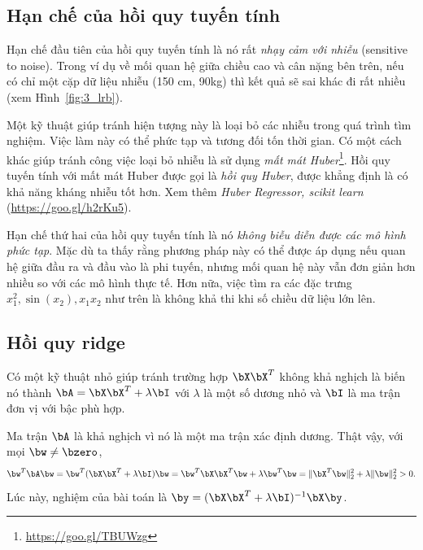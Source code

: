 \subsection{Hạn chế của hồi quy tuyến tính}

Hạn chế đầu tiên của hồi quy tuyến tính là nó rất \textit{nhạy cảm với nhiễu} (sensitive to noise). Trong ví dụ về mối quan hệ giữa chiều cao và cân
nặng bên trên, nếu có chỉ một cặp dữ liệu {nhiễu} (150 cm, 90kg) thì kết
quả sẽ sai khác đi rất nhiều (xem Hình~\ref{fig:3_lrb}).


Một kỹ thuật giúp tránh hiện tượng này là loại bỏ các nhiễu trong quá trình tìm nghiệm. Việc làm này có thể phức tạp và tương đối tốn thời gian. Có một cách khác giúp tránh công việc loại bỏ nhiễu là sử dụng \textit{mất mát Huber}\footnote{\url{https://goo.gl/TBUWzg}}. Hồi quy tuyến tính với mất mát Huber được gọi là \textit{hồi quy Huber}, được khẳng định là có khả năng kháng nhiễu tốt hơn. Xem thêm \textit{Huber Regressor, scikit learn} (\url{https://goo.gl/h2rKu5}).

Hạn chế thứ hai của hồi quy tuyến tính là nó \textit{không biễu diễn được các mô
hình phức tạp}. Mặc dù ta thấy rằng phương pháp này có thể được áp dụng nếu quan
hệ giữa đầu ra và đầu vào là phi tuyến, nhưng mối quan hệ này vẫn đơn giản hơn
nhiều so với các mô hình thực tế. Hơn nữa, việc tìm ra các đặc trưng $x_1^2,
\sin(x_2), x_1x_2$ như trên là không khả thi khi số chiều dữ liệu lớn lên.


\subsection{Hồi quy ridge}

Có một kỹ thuật nhỏ giúp tránh trường hợp $\bX\bX^T$ không khả nghịch là biến nó thành $\bA = \bX\bX^T + \lambda\bI$ với $\lambda$ là một số dương nhỏ
và $\bI$ là ma trận đơn vị với bậc phù hợp. 

Ma trận $\bA$ là khả nghịch vì nó là một ma trận xác định dương. Thật vậy, với
mọi $\bw \neq \bzero$,
\begin{equation*}
    \bw^T\bA\bw = \bw^T(\bX\bX^T + \lambda \bI) \bw = \bw^T\bX\bX^T\bw  +
    \lambda \bw^T\bw = \|\bX^T\bw\|_2^2 + \lambda \|\bw\|_2^2 > 0.
\end{equation*}
Lúc này, nghiệm của bài toán là $\by = (\bX \bX^T + \lambda \bI)^{-1} \bX\by$.

